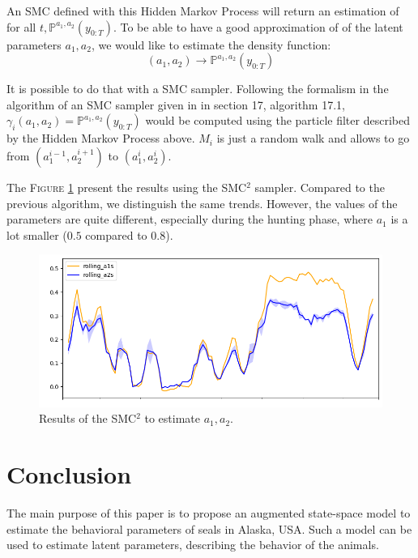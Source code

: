 An SMC defined with this Hidden Markov Process will return an estimation of for all $t, \mathbb{P}^{a_1,a_2}(y_{0:T})$.
To be able to have a good approximation of  of the latent parameters $a_1, a_2$, we would like to estimate the density function:
$$
(a_1, a_2) \xrightarrow{} \mathbb{P}^{a_1,a_2}(y_{0:T})
$$

 It is possible to do that with a SMC sampler.
 Following the formalism in the algorithm of an SMC sampler given in \cite{dowd2011estimating} in section 17, algorithm 17.1, $\gamma_i(a_1, a_2) = \mathbb{P}^{a_1,a_2}(y_{0:T})$ would be computed using the particle filter described by the Hidden Markov Process above.
 $M_i$ is just a random walk and allows to go from $(a_1^{i-1}, a_2^{i+1})$ to $(a_1^i, a_2^i)$.

 The \textsc{Figure} \ref{fig:SMC2} present the results using the SMC$^2$ sampler. Compared to the previous algorithm, we distinguish the same trends. However, the values of the parameters are quite different, especially during the hunting phase, where $a_1$ is a lot smaller ($0.5$ compared to $0.8$).

 \begin{figure}
\centering
\includegraphics[width=0.8\linewidth]{images/results_with_uncertainty_SMC2_cropped.png}
\caption{Results of the SMC$^2$ to estimate $a_1, a_2$.}
\label{fig:SMC2}
\end{figure}

\section{Conclusion}
The main purpose of this paper is to propose an augmented state-space model to estimate the behavioral parameters of seals in Alaska, USA.
Such a model can be used to estimate latent parameters, describing the behavior of the animals.

